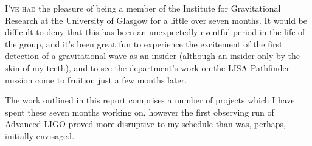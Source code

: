 \vfill
\lettrine{I}{'ve had} the pleasure of being a member of the Institute for
Gravitational Research at the University of Glasgow for a little over
seven months. It would be difficult to deny that this has been an
unexpectedly eventful period in the life of the group, and it's been
great fun to experience the excitement of the first detection of a
gravitational wave as an insider (although an insider only by the skin
of my teeth), and to see the department's work on the LISA Pathfinder
mission come to fruition just a few months later.  

The work outlined in this report comprises a number of projects which
I have spent these seven months working on, however the first
observing run of Advanced LIGO proved more disruptive to my schedule
than was, perhaps, initially envisaged.
\vfill
\newpage

